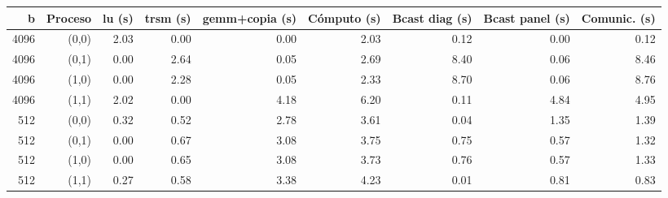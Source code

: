 \begin{tabular}{rrrrrrrrr}
\toprule
b & Proceso & lu (s) & trsm (s) & gemm+copia (s) & Cómputo (s) & Bcast diag (s) & Bcast panel (s) & Comunic. (s) \\
\midrule
4096 & (0,0) & 2.03 & 0.00 & 0.00 & 2.03 & 0.12 & 0.00 & 0.12 \\
4096 & (0,1) & 0.00 & 2.64 & 0.05 & 2.69 & 8.40 & 0.06 & 8.46 \\
4096 & (1,0) & 0.00 & 2.28 & 0.05 & 2.33 & 8.70 & 0.06 & 8.76 \\
4096 & (1,1) & 2.02 & 0.00 & 4.18 & 6.20 & 0.11 & 4.84 & 4.95 \\
512 & (0,0) & 0.32 & 0.52 & 2.78 & 3.61 & 0.04 & 1.35 & 1.39 \\
512 & (0,1) & 0.00 & 0.67 & 3.08 & 3.75 & 0.75 & 0.57 & 1.32 \\
512 & (1,0) & 0.00 & 0.65 & 3.08 & 3.73 & 0.76 & 0.57 & 1.33 \\
512 & (1,1) & 0.27 & 0.58 & 3.38 & 4.23 & 0.01 & 0.81 & 0.83 \\
\bottomrule
\end{tabular}
